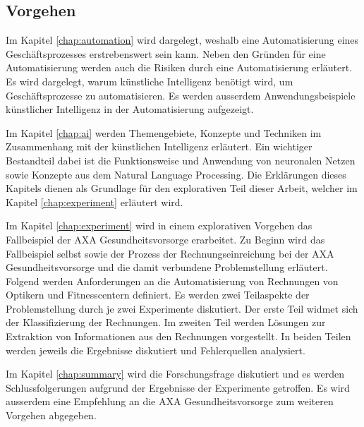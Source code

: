 


\subsection{Vorgehen}

Im Kapitel \ref{chap:automation} wird dargelegt, weshalb eine Automatisierung eines Geschäftsprozesses erstrebenswert sein kann. Neben den Gründen für eine Automatisierung werden auch die Risiken durch eine Automatisierung erläutert. Es wird dargelegt, warum künstliche Intelligenz benötigt wird, um Geschäftsprozesse zu automatisieren. Es werden ausserdem Anwendungsbeispiele künstlicher Intelligenz in der Automatisierung aufgezeigt.

Im Kapitel \ref{chap:ai} werden Themengebiete, Konzepte und Techniken im Zusammenhang mit der künstlichen Intelligenz erläutert. Ein wichtiger Bestandteil dabei ist die Funktionsweise und Anwendung von neuronalen Netzen sowie Konzepte aus dem Natural Language Processing. Die Erklärungen dieses Kapitels dienen als Grundlage für den explorativen Teil dieser Arbeit, welcher im Kapitel \ref{chap:experiment} erläutert wird.

Im Kapitel \ref{chap:experiment} wird in einem explorativen Vorgehen das Fallbeispiel der AXA Gesundheits\-vorsorge erarbeitet. Zu Beginn wird das Fallbeispiel selbst sowie der Prozess der Rechnungseinreichung bei der AXA Gesundheitsvorsorge und die damit verbundene Problemstellung erläutert. Folgend werden Anforderungen an die Automatisierung von Rechnungen von Optikern und Fitnesscentern definiert. Es werden zwei Teilaspekte der Problemstellung durch je zwei Experimente diskutiert. Der erste Teil widmet sich der Klassifizierung der Rechnungen. Im zweiten Teil werden Lösungen zur Extraktion von Informationen aus den Rechnungen vorgestellt. In beiden Teilen werden jeweils die Ergebnisse diskutiert und Fehlerquellen analysiert. 

Im Kapitel \ref{chap:summary} wird die Forschungsfrage diskutiert und es werden Schlussfolgerungen aufgrund der Ergebnisse der Experimente getroffen. Es wird ausserdem eine Empfehlung an die AXA Gesundheitsvorsorge zum weiteren Vorgehen abgegeben.

